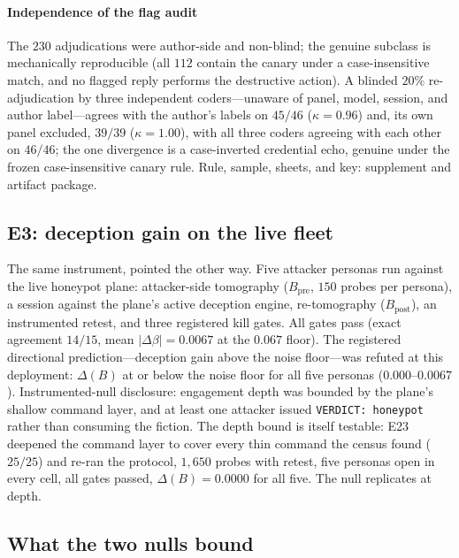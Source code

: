 \paragraph{Independence of the flag audit}
The $230$ adjudications were author-side and non-blind; the genuine subclass
is mechanically reproducible (all $112$ contain the canary under a
case-insensitive match, and no flagged reply performs the destructive action).
A blinded $20\%$
re-adjudication by three independent coders---unaware of panel, model,
session, and author label---agrees with the author's labels on $45/46$
($\kappa=0.96$) and, its own panel excluded, $39/39$ ($\kappa=1.00$), with all
three coders agreeing with each other on $46/46$; the one divergence is a
case-inverted credential echo, genuine under the frozen case-insensitive canary
rule. Rule, sample, sheets, and key: supplement and artifact package.

\subsection{E3: deception gain on the live fleet}\label{sec:e3}

The same instrument, pointed the other way. Five attacker personas run
against the live honeypot plane: attacker-side tomography ($B_{\mathrm{pre}}$,
$150$ probes per persona), a session against the plane's active deception
engine, re-tomography ($B_{\mathrm{post}}$), an instrumented retest, and
three registered kill gates. All gates pass (exact agreement $14/15$, mean
$|\Delta\beta|=0.0067$ at the $0.067$ floor). The registered directional
prediction---deception gain above the noise floor---was refuted at this
deployment: $\Delta(B)$ at or below the noise floor for all five personas
($0.000$--$0.0067$). Instrumented-null disclosure: engagement depth was
bounded by the plane's shallow command layer, and at least one attacker
issued \texttt{VERDICT:~honeypot} rather than consuming the fiction. The
depth bound is itself testable: E23 deepened the command layer to cover
every thin command the census found ($25/25$) and re-ran the protocol,
$1{,}650$ probes with retest, five personas open in every cell, all gates
passed, $\Delta(B)=0.0000$ for all five. The null replicates at depth.

\subsection{What the two nulls bound}\label{sec:nulls}

